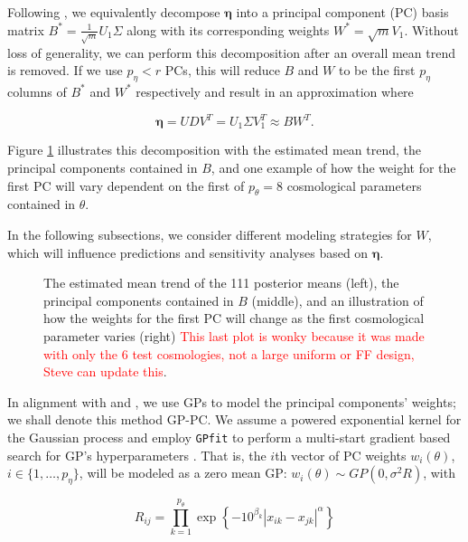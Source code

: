 \documentclass[11pt]{article}
\begin{document}
Following \cite{higdon2008computer, higdon2010estcosmo}, we equivalently decompose $\boldsymbol\eta$ into a principal component (PC) basis matrix $B^* = \frac{1}{\sqrt{m}}U_1\Sigma$ along with its corresponding weights $W^* = \sqrt{m}V_1$. Without loss of generality, we can perform this decomposition after an overall mean trend is removed. If we use $p_\eta < r$ PCs, this will reduce $B$ and $W$ to be the first $p_\eta$ columns of $B^*$ and $W^*$ respectively and result in an approximation where 

\begin{equation}
    \boldsymbol\eta= UDV^T = U_1\Sigma V_1^T \approx BW^T.
\end{equation}

Figure \ref{fig:mean_PCs_oneW} illustrates this decomposition with the estimated mean trend, the principal components contained in $B$, and one example of how the weight for the first PC will vary dependent on the first of $p_\theta=8$ cosmological parameters contained in $\theta$.

In the following subsections, we consider different modeling strategies for $W$, which will influence predictions and sensitivity analyses based on $\boldsymbol\eta$.

\begin{figure}
    \centering
    \caption{The estimated mean trend of the 111 posterior means (left), the principal components contained in $B$ (middle), and an illustration of how the weights for the first PC will change as the first cosmological parameter varies (right) \textcolor{red}{This last plot is wonky because it was made with only the 6 test cosmologies, not a large uniform or FF design, Steve can update this}.}
    \label{fig:mean_PCs_oneW}
\end{figure}


In alignment with \cite{heitmann2009coyote} and \cite{higdon2010estcosmo}, we use GPs to model the principal components' weights; we shall denote this method GP-PC. We assume a powered exponential kernel for the Gaussian process and employ \texttt{GPfit} to perform a multi-start gradient based search for GP's hyperparameters \citep{macdonald2015gpfit}. That is, the $i$th vector of PC weights $w_i(\theta)$, $i \in \{1,\ldots,p_\eta\}$, will be modeled as a zero mean GP: $w_i(\theta) \sim GP(0, \sigma^2R)$, with

\begin{equation*}
    R_{ij} = \prod_{k=1}^{p_\theta}\exp\left\{-10^{\beta_k}|x_{ik}-x_{jk}|^\alpha\right\}
\end{equation*}
\end{document}
